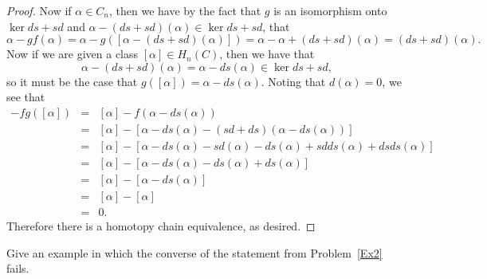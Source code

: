 \documentclass[10pt]{amsart}
\begin{document}
\begin{ex}
\begin{proof}
    Now if $\alpha \in C_n$, then we have by the fact that $g$ is an isomorphism onto $\ker ds + sd$ and $\alpha - (ds + sd)(\alpha) \in \ker ds + sd$, that
    $$\alpha - gf(\alpha) = \alpha - g([\alpha - (ds + sd)(\alpha)]) = \alpha - \alpha + (ds + sd)(\alpha) = (ds + sd)(\alpha).$$
    Now if we are given a class $[\alpha] \in H_n(C)$, then we have that
    $$\alpha - (ds + sd)(\alpha) = \alpha - ds(\alpha) \in \ker ds + sd,$$
    so it must be the case that $g([\alpha]) = \alpha - ds(\alpha)$.
    Noting that $d(\alpha) = 0$, we see that
    \begin{eqnarray*}
      [\alpha] - fg([\alpha]) &=& [\alpha] - f(\alpha - ds(\alpha))\\
      &=& [\alpha] - [\alpha - ds(\alpha) - (sd + ds)(\alpha - ds(\alpha))]\\
      &=& [\alpha] - [\alpha - ds(\alpha) - sd(\alpha) - ds(\alpha) + sdds(\alpha) + dsds(\alpha)]\\
      &=& [\alpha] - [\alpha - ds(\alpha) - ds(\alpha) + ds(\alpha)]\\
      &=& [\alpha] - [\alpha - ds(\alpha)]\\
      &=& [\alpha] - [\alpha]\\
      &=& 0.
    \end{eqnarray*}
    Therefore there is a homotopy chain equivalence, as desired.
  \end{proof}
\end{ex}

\begin{ex}
  Give an example in which the converse of the statement from Problem~\ref{Ex2} fails.
\end{ex}
\end{document}
